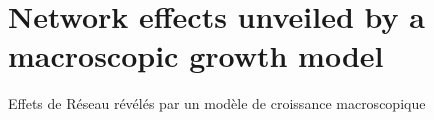 


\newpage



\section[Unveiling Network Effects][Effets de Réseaux]{Network effects unveiled by a macroscopic growth model}{Effets de Réseau révélés par un modèle de croissance macroscopique}














